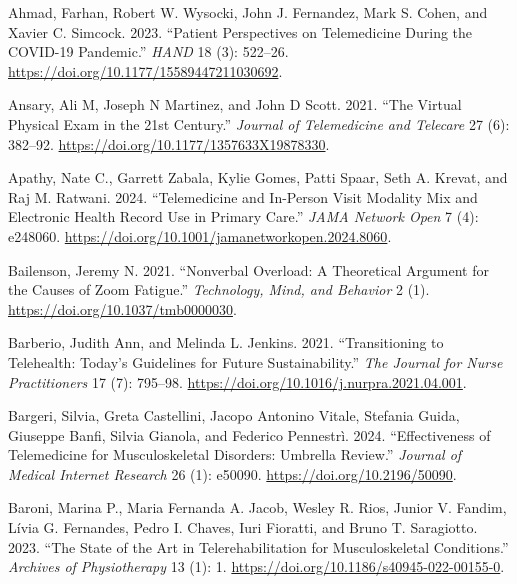 \documentclass[
  letterpaper,
  DIV=11,
  numbers=noendperiod,
  oneside]{scrartcl}
\newlength{\cslhangindent}
\newenvironment{CSLReferences}[2] %
 {\begin{list}{}{%
  \setlength{\itemindent}{0pt}
  \setlength{\leftmargin}{0pt}
  \setlength{\parsep}{0pt}
  \ifodd #1
   \setlength{\leftmargin}{\cslhangindent}
   \setlength{\itemindent}{-1\cslhangindent}
  \fi
  \setlength{\itemsep}{#2\baselineskip}}}
 {\end{list}}
\begin{document}
\label{refs}
\begin{CSLReferences}{1}{0}
Ahmad, Farhan, Robert W. Wysocki, John J. Fernandez, Mark S. Cohen, and
Xavier C. Simcock. 2023. {``Patient {Perspectives} on {Telemedicine
During} the {COVID-19 Pandemic}.''} \emph{HAND} 18 (3): 522--26.
\url{https://doi.org/10.1177/15589447211030692}.

Ansary, Ali M, Joseph N Martinez, and John D Scott. 2021. {``The Virtual
Physical Exam in the 21st Century.''} \emph{Journal of Telemedicine and
Telecare} 27 (6): 382--92.
\url{https://doi.org/10.1177/1357633X19878330}.

Apathy, Nate C., Garrett Zabala, Kylie Gomes, Patti Spaar, Seth A.
Krevat, and Raj M. Ratwani. 2024. {``Telemedicine and {In-Person Visit
Modality Mix} and {Electronic Health Record Use} in {Primary Care}.''}
\emph{JAMA Network Open} 7 (4): e248060.
\url{https://doi.org/10.1001/jamanetworkopen.2024.8060}.

Bailenson, Jeremy N. 2021. {``Nonverbal Overload: {A} Theoretical
Argument for the Causes of Zoom Fatigue.''} \emph{Technology, Mind, and
Behavior} 2 (1). \url{https://doi.org/10.1037/tmb0000030}.

Barberio, Judith Ann, and Melinda L. Jenkins. 2021. {``Transitioning to
{Telehealth}: {Today}'s {Guidelines} for {Future Sustainability}.''}
\emph{The Journal for Nurse Practitioners} 17 (7): 795--98.
\url{https://doi.org/10.1016/j.nurpra.2021.04.001}.

Bargeri, Silvia, Greta Castellini, Jacopo Antonino Vitale, Stefania
Guida, Giuseppe Banfi, Silvia Gianola, and Federico Pennestrì. 2024.
{``Effectiveness of {Telemedicine} for {Musculoskeletal Disorders}:
{Umbrella Review}.''} \emph{Journal of Medical Internet Research} 26
(1): e50090. \url{https://doi.org/10.2196/50090}.

Baroni, Marina P., Maria Fernanda A. Jacob, Wesley R. Rios, Junior V.
Fandim, Lívia G. Fernandes, Pedro I. Chaves, Iuri Fioratti, and Bruno T.
Saragiotto. 2023. {``The State of the Art in Telerehabilitation for
Musculoskeletal Conditions.''} \emph{Archives of Physiotherapy} 13 (1):
1. \url{https://doi.org/10.1186/s40945-022-00155-0}.


\end{CSLReferences}
\end{document}
